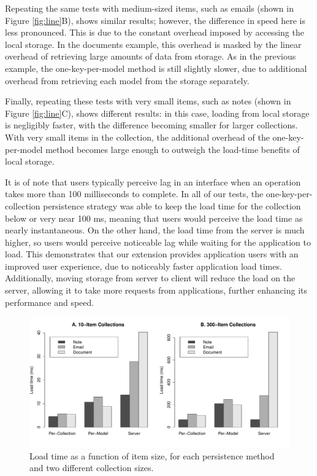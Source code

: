 \documentclass[12pt]{article}
\begin{document}
Repeating the same tests with medium-sized items, such as emails (shown in
Figure \ref{fig:line}B), shows similar results; however, the difference in
speed here is less pronounced. This is due to the constant overhead imposed by
accessing the local storage. In the documents example, this overhead is masked
by the linear overhead of retrieving large amounts of data from storage. As in
the previous example, the one-key-per-model method is still slightly slower,
due to additional overhead from retrieving each model from the storage
separately.

Finally, repeating these tests with very small items, such as notes (shown in
Figure \ref{fig:line}C), shows different results: in this case, loading from
local storage is negligibly faster, with the difference becoming smaller for
larger collections. With very small items in the collection, the additional
overhead of the one-key-per-model method becomes large enough to outweigh the
load-time benefits of local storage.

It is of note that users typically perceive lag in an interface when an
operation takes more than 100 milliseconds to complete. In all of our tests,
the one-key-per-collection persistence strategy was able to keep the load time for the
collection below or very near 100 ms, meaning that users would perceive the
load time as nearly instantaneous. On the other hand, the load time from the server is much
higher, so users would perceive noticeable lag while waiting for the application
to load. This demonstrates that our extension provides application users with
an improved user experience, due to noticeably faster application load times. Additionally, moving storage from server to client will reduce the load on the server, allowing it to take more requests from applications, further enhancing its performance and speed.

\begin{figure}[th]
  \centering
  \includegraphics[width=\textwidth]{bars.pdf}
  \caption{Load time as a function of item size, for each persistence method
  and two different collection sizes.}
  \label{fig:bar}
\end{figure}
\end{document}
